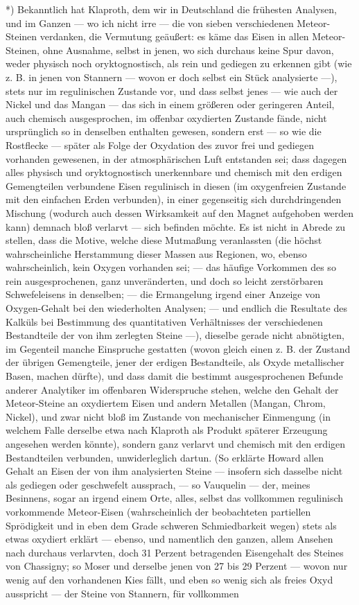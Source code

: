 \documentclass[a4paper, 11pt, oneside, german]{article}
\begin{document}
*) Bekanntlich hat Klaproth, dem wir in Deutschland die frühesten Analysen, und im Ganzen --- wo ich nicht irre --- die von sieben verschiedenen Meteor-Steinen verdanken, die Vermutung geäußert: es käme das Eisen in allen Meteor-Steinen, ohne Ausnahme, selbst in jenen, wo sich durchaus keine Spur davon, weder physisch noch oryktognostisch, als rein und gediegen zu erkennen gibt (wie z. B. in jenen von Stannern --- wovon er doch selbst ein Stück analysierte ---), stets nur im regulinischen Zustande vor, und dass selbst jenes --- wie auch der Nickel und das Mangan --- das sich in einem größeren oder geringeren Anteil, auch chemisch ausgesprochen, im offenbar oxydierten Zustande fände, nicht ursprünglich so in denselben enthalten gewesen, sondern erst --- so wie die Rostflecke --- später als Folge der Oxydation des zuvor frei und gediegen vorhanden gewesenen, in der atmosphärischen Luft entstanden sei; dass dagegen alles physisch und oryktognostisch unerkennbare und chemisch mit den erdigen Gemengteilen verbundene Eisen regulinisch in diesen (im oxygenfreien Zustande mit den einfachen Erden verbunden), in einer gegenseitig sich durchdringenden Mischung (wodurch auch dessen Wirksamkeit auf den Magnet aufgehoben werden kann) demnach bloß verlarvt --- sich befinden möchte. Es ist nicht in Abrede zu stellen, dass die Motive, welche diese Mutmaßung veranlassten (die höchst wahrscheinliche Herstammung dieser Massen aus Regionen, wo, ebenso wahrscheinlich, kein Oxygen vorhanden sei; --- das häufige Vorkommen des so rein ausgesprochenen, ganz unveränderten, und doch so leicht zerstörbaren Schwefeleisens in denselben; --- die Ermangelung irgend einer Anzeige von Oxygen-Gehalt bei den wiederholten Analysen; --- und endlich die Resultate des Kalküls bei Bestimmung des quantitativen Verhältnisses der verschiedenen Bestandteile der von ihm zerlegten Steine ---), dieselbe gerade nicht abnötigten, im Gegenteil manche Einspruche gestatten (wovon gleich einen z. B. der Zustand der übrigen Gemengteile, jener der erdigen Bestandteile, als Oxyde metallischer Basen, machen dürfte), und dass damit die bestimmt ausgesprochenen Befunde anderer Analytiker im offenbaren Widerspruche stehen, welche den Gehalt der Meteor-Steine an oxydiertem Eisen und andern Metallen (Mangan, Chrom, Nickel), und zwar nicht bloß im Zustande von mechanischer Einmengung (in welchem Falle derselbe etwa nach Klaproth als Produkt späterer Erzeugung angesehen werden könnte), sondern ganz verlarvt und chemisch mit den erdigen Bestandteilen verbunden, unwiderleglich dartun. (So erklärte Howard allen Gehalt an Eisen der von ihm analysierten Steine --- insofern sich dasselbe nicht als gediegen oder geschwefelt aussprach, --- so Vauquelin --- der, meines Besinnens, sogar an irgend einem Orte, alles, selbst das vollkommen regulinisch vorkommende Meteor-Eisen (wahrscheinlich der beobachteten partiellen Sprödigkeit und in eben dem Grade schweren Schmiedbarkeit wegen) stets als etwas oxydiert erklärt --- ebenso, und namentlich den ganzen, allem Ansehen nach durchaus verlarvten, doch 31 Perzent betragenden Eisengehalt des Steines von Chassigny; so Moser und derselbe jenen von 27 bis 29 Perzent --- wovon nur wenig auf den vorhandenen Kies fällt, und eben so wenig sich als freies Oxyd ausspricht --- der Steine von Stannern, für vollkommen 
\end{document}
